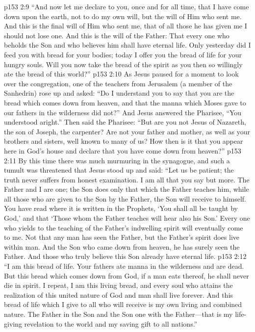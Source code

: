 \vs p153 2:9 \textcolor{ubdarkred}{“And now let me declare to you, once and for all time, that I have come down upon the earth, not to do my own will, but the will of Him who sent me. And this is the final will of Him who sent me, that of all those he has given me I should not lose one. And this is the will of the Father: That every one who beholds the Son and who believes him shall have eternal life. Only yesterday did I feed you with bread for your bodies; today I offer you the bread of life for your hungry souls. Will you now take the bread of the spirit as you then so willingly ate the bread of this world?”}
\pc \vs p153 2:10 As Jesus paused for a moment to look over the congregation, one of the teachers from Jerusalem (a member of the Sanhedrin) rose up and asked: “Do I understand you to say that you are the bread which comes down from heaven, and that the manna which Moses gave to our fathers in the wilderness did not?” And Jesus answered the Pharisee, \textcolor{ubdarkred}{“You understood aright.”} Then said the Pharisee: “But are you not Jesus of Nazareth, the son of Joseph, the carpenter? Are not your father and mother, as well as your brothers and sisters, well known to many of us? How then is it that you appear here in God’s house and declare that you have come down from heaven?”
\vs p153 2:11 By this time there was much murmuring in the synagogue, and such a tumult was threatened that Jesus stood up and said: \textcolor{ubdarkred}{“Let us be patient; the truth never suffers from honest examination. I am all that you say but more. The Father and I are one; the Son does only that which the Father teaches him, while all those who are given to the Son by the Father, the Son will receive to himself. You have read where it is written in the Prophets, ‘You shall all be taught by God,’ and that ‘Those whom the Father teaches will hear also his Son.’ Every one who yields to the teaching of the Father’s indwelling spirit will eventually come to me. Not that any man has seen the Father, but the Father’s spirit does live within man. And the Son who came down from heaven, he has surely seen the Father. And those who truly believe this Son already have eternal life.}
\vs p153 2:12 \textcolor{ubdarkred}{“I am this bread of life. Your fathers ate manna in the wilderness and are dead. But this bread which comes down from God, if a man eats thereof, he shall never die in spirit. I repeat, I am this living bread, and every soul who attains the realization of this united nature of God and man shall live forever. And this bread of life which I give to all who will receive is my own living and combined nature. The Father in the Son and the Son one with the Father---that is my life\hyp{}giving revelation to the world and my saving gift to all nations.”}\plusone
